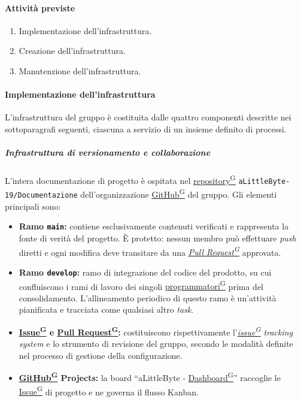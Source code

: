 \documentclass[a4paper,12pt]{article}
\providecommand{\glslink}[2]{\href{https://alittlebyte-19.github.io/Documentazione/glossario.html\#gls-#1}{\underline{#2}\textsuperscript{\scriptsize G}}}
\begin{document}
\paragraph{Attività previste}
\begin{enumerate}
    \item Implementazione dell'infrastruttura.
    \item Creazione dell'infrastruttura.
    \item Manutenzione dell'infrastruttura.
\end{enumerate}

\paragraph{Implementazione dell'infrastruttura}
L'infrastruttura del gruppo è costituita dalle quattro componenti descritte nei sottoparagrafi seguenti, ciascuna a servizio di un insieme definito di processi.

\subparagraph{Infrastruttura di versionamento e collaborazione}
L'intera documentazione di progetto è ospitata nel \glslink{repository}{repository} \texttt{aLittleByte-19/Documentazione} dell'organizzazione \glslink{github}{GitHub} del gruppo. Gli elementi principali sono:
\begin{itemize}
    \item \textbf{Ramo \texttt{main}:} contiene esclusivamente contenuti verificati e rappresenta la fonte di verità del progetto. È protetto: nessun membro può effettuare \textit{push} diretti e ogni modifica deve transitare da una \textit{\glslink{pull-request}{Pull Request}} approvata.
    \item \textbf{Ramo \texttt{develop}:} ramo di integrazione del codice del prodotto, su cui confluiscono i rami di lavoro dei singoli \glslink{programmatore}{programmatori} prima del consolidamento. L'allineamento periodico di questo ramo è un'attività pianificata e tracciata come qualsiasi altro \textit{task}.
    \item \textbf{\glslink{issue}{Issue} e \glslink{pull-request}{Pull Request}:} costituiscono rispettivamente l'\textit{\glslink{issue}{issue} tracking system} e lo strumento di revisione del gruppo, secondo le modalità definite nel processo di gestione della configurazione.
    \item \textbf{\glslink{github}{GitHub} Projects:} la board ``aLittleByte - \glslink{dashboard}{Dashboard}'' raccoglie le \glslink{issue}{Issue} di progetto e ne governa il flusso Kanban.
\end{itemize}
\end{document}
